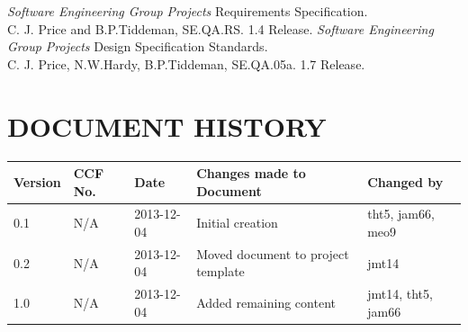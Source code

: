 \documentclass{project}
\begin{document}
\clearpage
{}
\begin{thebibliography}{5}
 \emph{Software Engineering Group Projects}
Requirements Specification. \\
C. J. Price and B.P.Tiddeman, SE.QA.RS. 1.4 Release.
 \emph{Software Engineering Group Projects}
Design Specification Standards. \\
C. J. Price, N.W.Hardy, B.P.Tiddeman, SE.QA.05a. 1.7 Release.
\end{thebibliography}
\section*{DOCUMENT HISTORY}
\begin{tabular}{|l | l | l | l | l |}
\hline
Version & CCF No. & Date & Changes made to Document & Changed by \\
\hline
0.1 & N/A & 2013-12-04 & Initial creation & tht5, jam66, meo9 \\
\hline
0.2 & N/A & 2013-12-04 & Moved document to project template & jmt14 \\
\hline
1.0 & N/A & 2013-12-04 & Added remaining content & jmt14, tht5, jam66 \\
\hline
\end{tabular}
\label{thelastpage}
\end{document}

